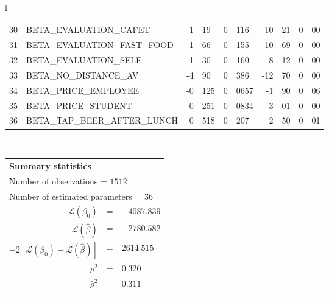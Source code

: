 \begin{tabular}{l}
\begin{tabular}{rlr@{.}lr@{.}lr@{.}lr@{.}l}
30 & BETA_EVALUATION_CAFET & 1&19 & 0&116 & 10&21 & 0&00\\
31 & BETA_EVALUATION_FAST_FOOD & 1&66 & 0&155 & 10&69 & 0&00\\
32 & BETA_EVALUATION_SELF & 1&30 & 0&160 & 8&12 & 0&00\\
33 & BETA_NO_DISTANCE_AV & -4&90 & 0&386 & -12&70 & 0&00\\
34 & BETA_PRICE_EMPLOYEE & -0&125 & 0&0657 & -1&90 & 0&06\\
35 & BETA_PRICE_STUDENT & -0&251 & 0&0834 & -3&01 & 0&00\\
36 & BETA_TAP_BEER_AFTER_LUNCH & 0&518 & 0&207 & 2&50 & 0&01\\
\hline
\end{tabular}
\\
\begin{tabular}{rcl}
\multicolumn{3}{l}{\bf Summary statistics}\\
\multicolumn{3}{l}{ Number of observations = $1512$} \\
\multicolumn{3}{l}{ Number of estimated  parameters = $36$} \\
 $\mathcal{L}(\beta_0)$ &=&  $-4087.839$ \\
 $\mathcal{L}(\hat{\beta})$ &=& $-2780.582 $  \\
 $-2[\mathcal{L}(\beta_0) -\mathcal{L}(\hat{\beta})]$ &=& $2614.515$ \\
    $\rho^2$ &=&   $0.320$ \\
    $\bar{\rho}^2$ &=&    $0.311$ \\
\end{tabular}
  \end{tabular}
